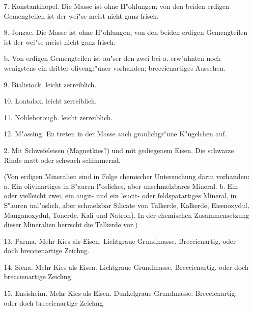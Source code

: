\documentclass[a4paper, 11pt, oneside, polutonikogreek, german]{article}
\begin{document}
\hspace*{15mm}7. Konstantinopel. Die Masse ist ohne H"ohlungen; von den beiden erdigen Gemengteilen ist der wei"se meist nicht ganz frisch.

\hspace*{15mm}8. Jonzac. Die Masse ist ohne H"ohlungen; von den beiden erdigen Gemengteilen ist der wei"se meist nicht ganz frisch.

\vspace{2ex}

\hspace*{10mm}b. Von erdigen Gemengteilen ist au"ser den zwei bei a. erw"ahnten noch wenigstens ein dritter olivengr"uner vorhanden; breccienartiges Aussehen.

\hspace*{15mm}9. Bialistock. leicht zerreiblich.

\hspace*{15mm}10. Lontalax. leicht zerreiblich.

\hspace*{15mm}11. Nobleborough. leicht zerreiblich.

\hspace*{15mm}12. M"assing. En treten in der Masse auch graulichgr"une K"ugelchen auf.

\vspace{5ex}

2. Mit Schwefeleisen (Magnetkies?) und mit gediegenem Eisen. Die schwarze Rinde matt oder schwach schimmernd.

\vspace{2ex}

(Von erdigen Mineralien sind in Folge chemischer Untersuchung darin vorhanden: a. Ein olivinartiges in S"auren l"osliches, aber unschmelzbares Mineral. b. Ein oder vielleicht zwei, ein augit- und ein leucit- oder feldspatartiges Mineral, in S"auren unl"oslich, aber schmelzbar Silicate von Talkerde, Kalkerde, Eisenoxydul, Manganoxydul, Tonerde, Kali und Natron). In der chemischen Zusammensetzung dieser Mineralien herrscht die Talkerde vor.)

\vspace{2ex}

13. Parma. Mehr Kies als Eisen. Lichtgraue Grundmasse. Breccienartig, oder doch breccienartige Zeichng.

14. Siena. Mehr Kies als Eisen. Lichtgraue Grundmasse. Breccienartig, oder doch breccienartige Zeichng.

15. Ensisheim. Mehr Kies als Eisen. Dunkelgraue Grundmasse. Breccienartig, oder doch breccienartige Zeichng.
\end{document}

